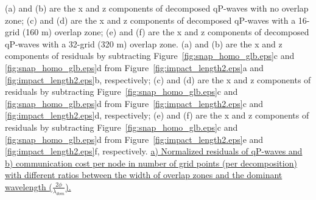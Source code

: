 \documentclass[manuscript,ulem,graphix,revised]{geophysics}
\begin{document}
 {
(a) and (b) are the x and z components of decomposed qP-waves with no overlap zone; 
(c) and (d) are the x and z components of decomposed qP-waves with a 16-grid (160 m) overlap zone; 
(e) and (f) are the x and z components of decomposed qP-waves with a 32-grid (320 m) overlap zone.
}
 {
(a) and (b) are the x and z components of residuals by subtracting Figure~\ref{fig:snap_homo_glb.eps}c and \ref{fig:snap_homo_glb.eps}d from Figure~\ref{fig:impact_length2.eps}a and \ref{fig:impact_length2.eps}b, respectively; 
(c) and (d) are the x and z components of residuals by subtracting Figure~\ref{fig:snap_homo_glb.eps}c and \ref{fig:snap_homo_glb.eps}d from Figure~\ref{fig:impact_length2.eps}c and \ref{fig:impact_length2.eps}d, respectively;
(e) and (f) are the x and z components of residuals by subtracting Figure~\ref{fig:snap_homo_glb.eps}c and \ref{fig:snap_homo_glb.eps}d from Figure~\ref{fig:impact_length2.eps}e and \ref{fig:impact_length2.eps}f, respectively.
}
{
\uline{a) Normalized residuals of qP-waves and b) communication cost per node in number of grid points (per decomposition) with different ratios between the width of overlap zones and the dominant wavelength ($\frac{2\phi}{\lambda_{dom}}$). }
}
\end{document}
